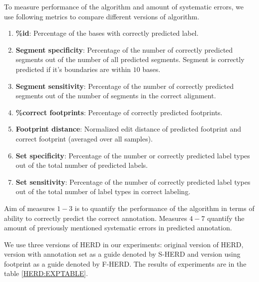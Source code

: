 To measure performance of the algorithm and amount of systematic errors, we use
following metrics to compare different versions of algorithm.
\begin{enumerate}[itemsep=-1mm]
\item {\bf \%id}: Percentage of the bases with correctly predicted label.

\item {\bf Segment specificity}: Percentage of the number of correctly predicted
segments out of the number of all predicted segments. Segment is correctly
predicted if it's boundaries are within $10$ bases.

\item {\bf Segment sensitivity}: Percentage of the number of correctly predicted
segments out of the number of segments in the correct alignment.

\item {\bf \%correct footprints}: Percentage of correctly predicted footprints.

\item {\bf Footprint distance}: Normalized edit distance of predicted footprint
and correct footprint (averaged over all samples).

\item {\bf Set specificity}: Percentage of the number or correctly predicted label
types out of the total number of predicted labels.

\item {\bf Set sensitivity}: Percentage of the number of correctly predicted label
types out of the total number of label types in correct labeling.

\end{enumerate} 
Aim of measures $1-3$ is to quantify the performance of the algorithm in terms
of ability to correctly predict the correct annotation. Measures $4-7$ quantify
the amount of previously mentioned systematic errors in predicted annotation.

We use three versions of HERD in our experiments: original version of HERD,
version with annotation set as a guide denoted by S-HERD and version using
footprint as a guide denoted by F-HERD. The results of experiments are in the
table \ref{HERD:EXPTABLE}. 

